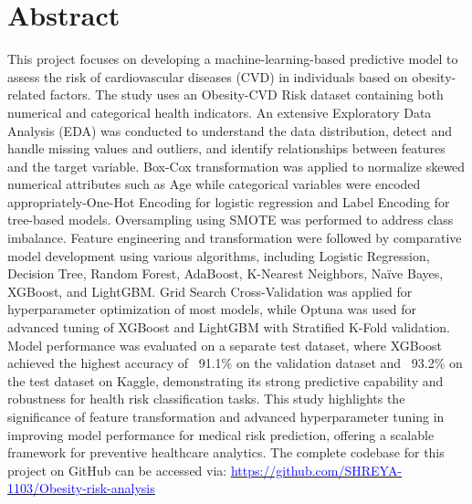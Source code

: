 \documentclass[12pt,a4paper]{report}
\begin{document}
    {
        \let\clearpage\relax
        
    }

    {
        \let\clearpage\relax
        \chapter*{Abstract}
        This project focuses on developing a machine-learning-based predictive model to assess the risk of cardiovascular diseases (CVD) in individuals based on obesity-related factors.
        The study uses an Obesity-CVD Risk dataset containing both numerical and categorical health indicators.
        An extensive Exploratory Data Analysis (EDA) was conducted to understand the data distribution, detect and handle missing values and outliers, and identify relationships between features and the target variable.
        Box-Cox transformation was applied to normalize skewed numerical attributes such as Age while categorical variables were encoded appropriately-One-Hot Encoding for logistic regression and Label Encoding for tree-based models.
        Oversampling using SMOTE was performed to address class imbalance.
        Feature engineering and transformation were followed by comparative model development using various algorithms, including Logistic Regression, Decision Tree, Random Forest, AdaBoost, K-Nearest Neighbors, Na\"ive Bayes, XGBoost, and LightGBM. Grid Search Cross-Validation was applied for hyperparameter optimization of most models, while Optuna was used for advanced tuning of XGBoost and LightGBM with Stratified K-Fold validation.
        Model performance was evaluated on a separate test dataset, where XGBoost achieved the highest accuracy of ~91.1\% on the validation dataset and ~93.2\% on the test dataset on Kaggle, demonstrating its strong predictive capability and robustness for health risk classification tasks.
        This study highlights the significance of feature transformation and advanced hyperparameter tuning in improving model performance for medical risk prediction, offering a scalable framework for preventive healthcare analytics.
        The complete codebase for this project on GitHub can be accessed via:
        \href{https://github.com/SHREYA-1103/Obesity-risk-analysis}{\underline{\textcolor{blue}{https://github.com/SHREYA-1103/Obesity-risk-analysis}}}

    }
\end{document}
